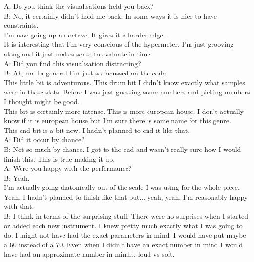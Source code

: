 A: Do you think the visualisations held you back?\\

B: No, it certainly didn't hold me back. In some ways it is nice to have constraints.\\

I'm now going up an octave. It gives it a harder edge...\\

It is interesting that I'm very conscious of the hypermeter. I'm just grooving along and it just makes sense to evaluate in time.\\

A: Did you find this visualisation distracting?\\

B: Ah, no. In general I'm just so focussed on the code.\\

This little bit is adventurous. This drum bit I didn't know exactly what samples were in those slots. Before I was just guessing some numbers and picking numbers I thought might be good.\\

This bit is certainly more intense. This is more european house. I don't actually know if it is european house but I'm sure there is some name for this genre.\\

This end bit is a bit new. I hadn't planned to end it like that.\\

A: Did it occur by chance?\\

B: Not so much by chance. I got to the end and wasn't really sure how I would finish this. This is true making it up.\\

A: Were you happy with the performance?\\

B: Yeah.\\

I'm actually going diatonically out of the scale I was using for the whole piece.\\

Yeah, I hadn't planned to finish like that but... yeah, yeah, I'm reasonably happy with that.\\

B: I think in terms of the surprising stuff. There were no surprises when I started or added each new instrument. I knew pretty much exactly what I was going to do. I might not have had the exact parameters in mind. I would have put maybe a 60 instead of a 70. Even when I didn't have an exact number in mind I would have had an approximate number in mind... loud vs soft.\\

